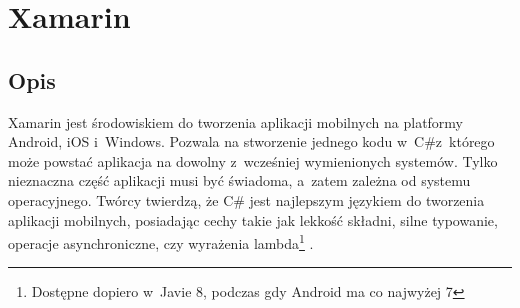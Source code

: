 



\section{Xamarin}
\subsection{Opis}
Xamarin jest środowiskiem do tworzenia aplikacji mobilnych na platformy Android, iOS i~Windows\cite{xamarin-overview}.
Pozwala na stworzenie jednego kodu w~C\#z~którego może powstać aplikacja na dowolny z~wcześniej wymienionych systemów. Tylko nieznaczna część aplikacji musi być świadoma, a~zatem zależna od systemu operacyjnego.
Twórcy twierdzą, że C\# jest najlepszym językiem do tworzenia aplikacji mobilnych, posiadając cechy takie jak lekkość składni, silne typowanie, operacje asynchroniczne, czy wyrażenia lambda\footnote{Dostępne dopiero w~Javie 8\cite{java-8-features}, podczas gdy Android ma co najwyżej 7\cite{android-java-7}} .

